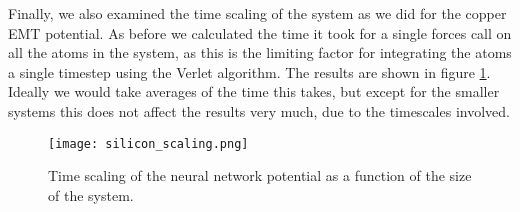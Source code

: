 Finally, we also examined the time scaling of the system as we did for the
copper EMT potential.
As before we calculated the time it took for a single forces call
on all the atoms in the system, as this is the limiting
factor for integrating the atoms a single timestep using the
Verlet algorithm.
The results are shown in figure \ref{fig:silicon-scaling}.
Ideally we would take averages of the time this takes, but except
for the smaller systems this does not affect the results very much,
due to the timescales involved.

\begin{figure}
    \centering
    \texttt{[image: silicon\_scaling.png]}
    \caption{Time scaling of the neural network potential
        as a function of the size of the system.}
    \label{fig:silicon-scaling}
\end{figure}

